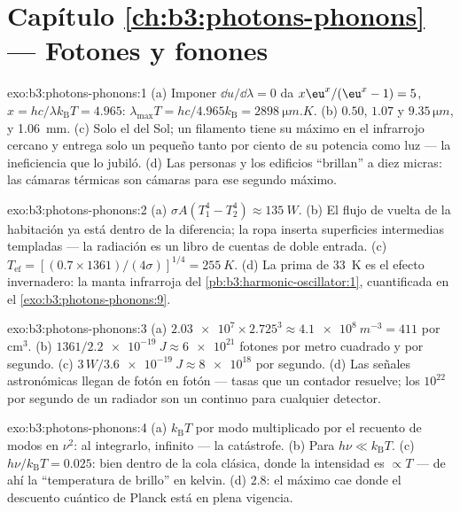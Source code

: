\section*{Capítulo \ref{ch:b3:photons-phonons} --- Fotones y fonones}

\begin{solution}{exo:b3:photons-phonons:1}
(a) Imponer $\dd u/\dd\lambda = 0$ da $x\eu^x/(\eu^x - 1) = 5$,
$x = hc/\lambda k_{\text{B}}T = 4.965$: $\lambda_{\max}T =
hc/4.965k_{\text{B}} = \qty{2898}{\micro m.K}$. (b) $0.50$,
$1.07$ y $9.35\,\unit{\micro m}$, y \qty{1.06}{mm}. (c) Solo el
del Sol; un filamento tiene su máximo en el infrarrojo cercano y entrega solo
un pequeño tanto por ciento de su potencia como luz --- la ineficiencia que
lo jubiló. (d) Las personas y los edificios ``brillan'' a diez micras:
las cámaras térmicas son cámaras para ese segundo máximo.
\end{solution}

\begin{solution}{exo:b3:photons-phonons:2}
(a) $\sigma A(T_1^4 - T_2^4) \approx \qty{135}{W}$. (b) El flujo de
vuelta de la habitación ya está dentro de la diferencia; la ropa inserta
superficies intermedias templadas --- la radiación es un libro de cuentas de
doble entrada. (c)
$T_{\text{ef}} = [(0.7 \times 1361)/(4\sigma)]^{1/4} =
\qty{255}{K}$. (d) La prima de \qty{33}{K} es el efecto invernadero:
la manta infrarroja del
\cref{pb:b3:harmonic-oscillator:1}, cuantificada en el
\cref{exo:b3:photons-phonons:9}.
\end{solution}

\begin{solution}{exo:b3:photons-phonons:3}
(a) $\num{2.03e7} \times 2.725^3 \approx \qty{4.1e8}{m^{-3}} =
411$ por cm$^3$. (b) $1361/\qty{2.2e-19}{J} \approx
\num{6e21}$ fotones por metro cuadrado y por segundo. (c) $3\,\unit{W}/
\qty{3.6e-19}{J} \approx \num{8e18}$ por segundo. (d) Las señales
astronómicas llegan de fotón en fotón --- tasas que un contador resuelve;
los $10^{22}$ por segundo de un radiador son un continuo para cualquier detector.
\end{solution}

\begin{solution}{exo:b3:photons-phonons:4}
(a) $k_{\text{B}}T$ por modo multiplicado por el recuento de modos en $\nu^2$:
al integrarlo, infinito --- la catástrofe. (b) Para $h\nu \ll
k_{\text{B}}T$. (c) $h\nu/k_{\text{B}}T = 0.025$: bien dentro de la
cola clásica, donde la intensidad es $\propto T$ --- de ahí la
``temperatura de brillo'' en kelvin. (d) $2.8$: el máximo cae
donde el descuento cuántico de Planck está en plena vigencia.
\end{solution}

